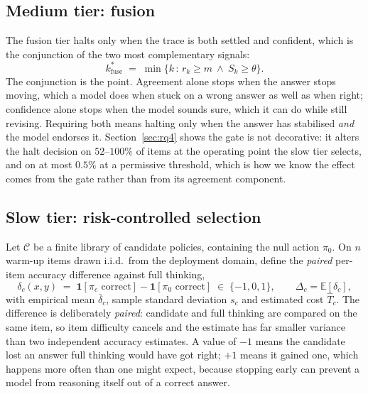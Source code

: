 \documentclass[acmsmall]{acmart}
\theoremstyle{acmdefinition}%
\theoremstyle{acmplain}}{}%
\begin{document}
\subsection{Medium tier: fusion}
The fusion tier halts only when the trace is both settled and confident, which is the conjunction of the two most complementary signals:
\begin{equation}
k^\ast_{\mathrm{fuse}} \;=\; \min\{k \,:\, r_k \geq m \ \wedge\ S_k \geq \theta\}.
\label{eq:fusion}
\end{equation}
The conjunction is the point. Agreement alone stops when the answer stops moving, which a model does when stuck on a wrong answer as well as when right; confidence alone stops when the model sounds sure, which it can do while still revising. Requiring both means halting only when the answer has stabilised \emph{and} the model endorses it. Section~\ref{sec:rq4} shows the gate is not decorative: it alters the halt decision on $52$--$100\%$ of items at the operating point the slow tier selects, and on at most $0.5\%$ at a permissive threshold, which is how we know the effect comes from the gate rather than from its agreement component.

\subsection{Slow tier: risk-controlled selection}
Let $\mathcal{C}$ be a finite library of candidate policies, containing the null action $\pi_0$. On $n$ warm-up items drawn i.i.d.\ from the deployment domain, define the \emph{paired} per-item accuracy difference against full thinking,
\begin{equation}
\delta_c(x,y) \;=\; \mathbf{1}[\pi_c \text{ correct}] - \mathbf{1}[\pi_0 \text{ correct}] \;\in\; \{-1,0,1\},
\qquad \Delta_c = \mathbb{E}[\delta_c],
\label{eq:delta}
\end{equation}
with empirical mean $\bar\delta_c$, sample standard deviation $s_c$ and estimated cost $\hat T_c$. The difference is deliberately \emph{paired}: candidate and full thinking are compared on the same item, so item difficulty cancels and the estimate has far smaller variance than two independent accuracy estimates. A value of $-1$ means the candidate lost an answer full thinking would have got right; $+1$ means it gained one, which happens more often than one might expect, because stopping early can prevent a model from reasoning itself out of a correct answer.
\end{document}
